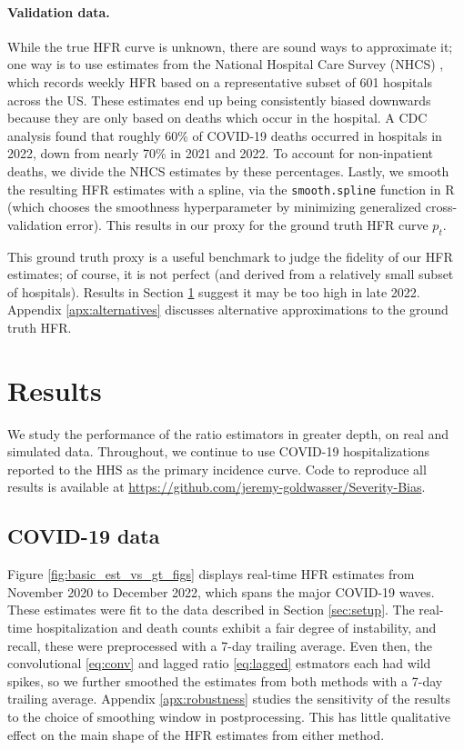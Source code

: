 \documentclass{article}
\begin{document}
\paragraph{Validation data.}


While the true HFR curve is unknown, there are sound ways to approximate it; one  
way is to use estimates from the National Hospital Care Survey (NHCS)
\citep{NHCS2023}, which records weekly HFR based on a representative subset 
of 601 hospitals across the US. These estimates end up being consistently
biased downwards because they are only based on deaths which occur in the
hospital. A CDC analysis \citep{ahmad2023covid} found that roughly 60\% of
COVID-19 deaths occurred in hospitals in 2022, down from nearly 70\% in 2021 and
2022. To account for non-inpatient deaths, we divide the NHCS estimates by these
percentages. Lastly, we smooth the resulting HFR estimates with a spline, via
the \texttt{smooth.spline} function in R (which chooses the smoothness
hyperparameter by minimizing generalized cross-validation error). This results 
in our proxy for the ground truth HFR curve $p_t$.  

This ground truth proxy is a useful benchmark to judge the fidelity of our HFR
estimates; of course, it is not perfect (and derived from a relatively small
subset of hospitals). Results in Section \ref{sec:results} suggest it may be too
high in late 2022. Appendix \ref{apx:alternatives} discusses alternative
approximations to the ground truth HFR.    

\section{Results}
\label{sec:results}

We study the performance of the ratio estimators in greater depth, on real and 
simulated data. Throughout, we continue to use COVID-19 hospitalizations
reported to the HHS as the primary incidence curve. Code to reproduce all
results is available at
\url{https://github.com/jeremy-goldwasser/Severity-Bias}.            

\subsection{COVID-19 data}
\label{sec:results_real}

Figure \ref{fig:basic_est_vs_gt_figs} displays real-time HFR estimates from
November 2020 to December 2022, which spans the major COVID-19 waves. These
estimates were fit to the data described in Section \ref{sec:setup}. The
real-time hospitalization and death counts exhibit a fair degree of instability,
and recall, these were preprocessed with a 7-day trailing average. Even then,
the convolutional \eqref{eq:conv} and lagged ratio \eqref{eq:lagged} estmators
each had wild spikes, so we further smoothed the estimates from both methods
with a 7-day trailing average. Appendix \ref{apx:robustness} studies the
sensitivity of the results to the choice of smoothing window in postprocessing.
This has little qualitative effect on the main shape of the HFR estimates from
either method.    
\end{document}
